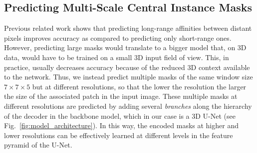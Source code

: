\subsection{Predicting Multi-Scale Central Instance Masks}\label{sec:multiscale_patches}
Previous related work \cite{lee2017superhuman,liu2018affinity,Gao_2019_ICCV} shows that predicting long-range affinities between distant pixels improves accuracy as compared to predicting only short-range ones. However, predicting large \maskname masks would translate to a bigger model that, on 3D data, would have to be trained on a small 3D input field of view.
This, in practice, usually decreases accuracy because of the reduced 3D context available to the network.
Thus, we instead predict multiple \maskname masks of the same window size $7 \times 7 \times 5$ but at different resolutions, so that the lower the resolution the larger the size of the associated patch in the input image. 
These multiple masks at different resolutions are predicted by adding several \emph{\encBr branches} along the hierarchy of the decoder in the backbone model, which in our case is a 3D U-Net \cite{ronneberger2015u,cciccek20163d} (see Fig.~\ref{fig:model_architecture}). 
In this way, the encoded \maskname masks at higher and lower resolutions can be effectively learned at different levels in the feature pyramid of the U-Net.



